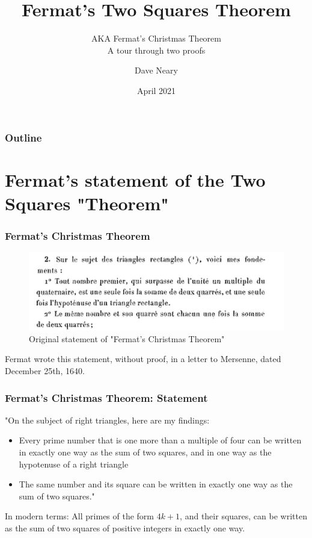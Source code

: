\documentclass{beamer}
\title{Fermat's Two Squares Theorem}
\subtitle{AKA Fermat's Christmas Theorem\\A tour through two proofs}
\author{Dave Neary}
\date{April 2021}
\begin{document}
\frame{\titlepage}

\begin{frame}
	\frametitle{Outline}
	\tableofcontents
\end{frame}

\section{Fermat's statement of the Two Squares "Theorem"}

\begin{frame}
	\frametitle{Fermat's Christmas Theorem}
\begin{figure}
        \includegraphics[width=\linewidth]{extrait_letrre_du_25_decembre_1640.png}
        \caption*{Original statement of "Fermat's Christmas Theorem"}
        \label{fig:fermat1}
\end{figure}

	Fermat wrote this statement, without proof, in a letter to Mersenne, dated December
	25th, 1640.
\end{frame}

\begin{frame}
	\frametitle{Fermat's Christmas Theorem: Statement}
	
"On the subject of right triangles, here are my findings:
	\begin{itemize}
	\item Every prime number that is one more than a multiple of four can be written in exactly
		one way as the sum of two squares, and in one way as the hypotenuse of a right triangle
	\item The same number and its square can be written in exactly one way as the sum of two squares."
	\end{itemize}

	In modern terms: All primes of the form $4k+1$, and their squares, can be written as the sum of two
	squares of positive integers in exactly one way.
\end{frame}
\end{document}

